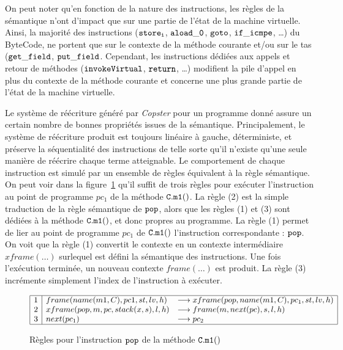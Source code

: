 On peut noter qu'en fonction de la nature des instructions, les règles
de la sémantique n'ont d'impact que sur une partie de l'état de la
machine virtuelle. Ainsi, la majorité des instructions ($\mathtt{store_i}$,
$\mathtt{aload\_0}$, $\mathtt{goto}$, $\mathtt{if\_icmpe}$, \dots) du ByteCode,
ne portent que sur le contexte de la méthode courante et/ou sur le tas
($\mathtt{get\_field}$, $\mathtt{put\_field}$. Cependant, les instructions
dédiées aux appels et retour de méthodes ($\mathtt{invokeVirtual}$, $\mathtt{return}$, \dots)
modifient la pile d'appel en plus du contexte de la méthode courante et
concerne une plus grande partie de l'état de la machine virtuelle.

Le système de réécriture généré par \emph{Copster} pour un programme
donné assure un certain nombre de bonnes propriétés issues de la
sémantique. Principalement, le système de réécriture produit est toujours
linéaire à gauche, déterministe, et préserve la séquentialité
des instructions de telle sorte qu'il n'existe qu'une seule manière de
réécrire chaque terme atteignable.  Le comportement de chaque
instruction est simulé par un ensemble de règles équivalent à la règle
sémantique. On peut voir dans la figure~\ref{fig:semantique-trs} qu'il suffit
de trois règles pour exécuter l'instruction au point de programme $pc_1$ de la méthode
$\mathtt{C.m1()}$. La règle (2) est la simple traduction de la règle sémantique de $\mathtt{pop}$,
alors que les règles (1) et (3) sont dédiées à la méthode $\mathtt{C.m1}()$, et donc propres au 
programme. La règle (1) permet de lier au point de programme $pc_1$ de $\mathtt{C.m1}()$ l'instruction
correspondante : $\mathtt{pop}$. On voit que la règle (1) convertit le contexte en un contexte intermédiaire $xframe(\dots)$
surlequel est défini la sémantique des instructions. Une fois l'exécution terminée, un nouveau 
contexte $frame(\dots)$ est produit. La règle (3) incrémente simplement l'index de l'instruction à exécuter.

\begin{figure}[ht!]
  \centering
  \[
  {%
    \begin{array}{|c|ll|}
      \hline
      1 & frame(name(m1, C), pc1, st, lv, h) & \lrw xframe(pop, name(m1, C), pc_1, st, lv, h)\\
      2 & xframe(pop, m, pc, stack(x, s), l, h) & \lrw frame(m, next(pc), s, l, h) \\
      3 & next(pc_1) &\lrw pc_2 \\
      \hline
    \end{array}
  }
  \]
  \caption{\footnotesize Règles pour l'instruction $\mathtt{pop}$ de la méthode $\mathtt{C.m1()}$}
  \label{fig:semantique-trs}
\end{figure}


